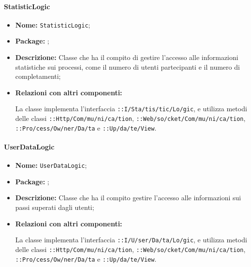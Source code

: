 \paragraph{StatisticLogic}
\begin{flushleft}
\begin{itemize}
\item \textbf{Nome:} \texttt{StatisticLogic};
\item \textbf{Package:} \texttt{\logicAdmin{}};
\item \textbf{Descrizione:} Classe che ha il compito di gestire l'accesso alle informazioni statistiche sui processi, come il numero di utenti partecipanti e il numero di completamenti;
\item \textbf{Relazioni con altri componenti:}
\begin{sloppypar}
La classe implementa l'interfaccia \texttt{\iLogicAdmin{}::I\fshyp{}Sta\fshyp{}tis\fshyp{}tic\fshyp{}Lo\fshyp{}gic}, e utilizza metodi delle classi \texttt{\serverCommunication{}::Http\fshyp{}Com\fshyp{}mu\fshyp{}ni\fshyp{}ca\fshyp{}tion}, \texttt{\serverCommunication{}::Web\fshyp{}so\fshyp{}cket\fshyp{}Com\fshyp{}mu\fshyp{}ni\fshyp{}ca\fshyp{}tion}, \texttt{\modelAdmin{}::Pro\fshyp{}cess\fshyp{}Ow\fshyp{}ner\fshyp{}Da\fshyp{}ta} e \texttt{\logicAdmin{}::Up\fshyp{}da\fshyp{}te\fshyp{}View}.
\end{sloppypar}
\end{itemize}
\end{flushleft}

\paragraph{UserDataLogic}
\begin{flushleft}
\begin{itemize}
\item \textbf{Nome:} \texttt{UserDataLogic};
\item \textbf{Package:} \texttt{\logicAdmin{}};
\item \textbf{Descrizione:} Classe che ha il compito gestire l'accesso alle informazioni sui passi superati dagli utenti;
\item \textbf{Relazioni con altri componenti:}
\begin{sloppypar}
La classe implementa l'interfaccia \texttt{\iLogicAdmin{}::I\fshyp{}U\fshyp{}ser\fshyp{}Da\fshyp{}ta\fshyp{}Lo\fshyp{}gic}, e utilizza metodi delle classi \texttt{\serverCommunication{}::Http\fshyp{}Com\fshyp{}mu\fshyp{}ni\fshyp{}ca\fshyp{}tion}, \texttt{\serverCommunication{}::Web\fshyp{}so\fshyp{}cket\fshyp{}Com\fshyp{}mu\fshyp{}ni\fshyp{}ca\fshyp{}tion}, \texttt{\modelAdmin{}::Pro\fshyp{}cess\fshyp{}Ow\fshyp{}ner\fshyp{}Da\fshyp{}ta} e \texttt{\logicAdmin{}::Up\fshyp{}da\fshyp{}te\fshyp{}View}.
\end{sloppypar}
\end{itemize}
\end{flushleft}

